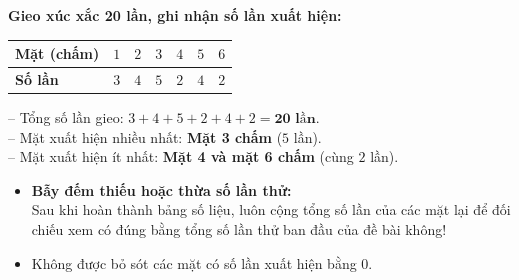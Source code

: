 \documentclass[11pt,a4paper]{article}
\begin{document}
\vspace{-2.5mm}
\noindent
\begin{minipage}[t]{0.49\textwidth}\vspace{0pt}
\begin{tcolorbox}[
  enhanced,
  colback=green!4!white,
  colframe=green!60!black,
  arc=2mm, boxrule=0.8pt,
  left=2mm, right=2mm, top=1.8mm, bottom=1.8mm,
  title={\footnotesize\bfseries\color{white}\faCheckCircle\ Ví dụ thực hành chuẩn mực}
]
{\footnotesize
\textbf{Gieo xúc xắc 20 lần, ghi nhận số lần xuất hiện:}\\
\begin{center}
\renewcommand{\arraystretch}{1.1}
\begin{tabular}{|l|c|c|c|c|c|c|}
  \hline
  \textbf{Mặt (chấm)} & $1$ & $2$ & $3$ & $4$ & $5$ & $6$ \\
  \hline
  \textbf{Số lần} & $3$ & $4$ & $5$ & $2$ & $4$ & $2$ \\
  \hline
\end{tabular}
\end{center}
-- Tổng số lần gieo: $3 + 4 + 5 + 2 + 4 + 2 = \mathbf{20\text{ lần}}$.\\
-- Mặt xuất hiện nhiều nhất: \textbf{Mặt 3 chấm} ($5$ lần).\\
-- Mặt xuất hiện ít nhất: \textbf{Mặt 4 và mặt 6 chấm} (cùng $2$ lần).
}
\end{tcolorbox}
\end{minipage}
\hfill
\begin{minipage}[t]{0.49\textwidth}\vspace{0pt}
\begin{tcolorbox}[
  enhanced,
  colback=red!4!white,
  colframe=red!70!black,
  arc=2mm, boxrule=0.8pt,
  left=2mm, right=2mm, top=1.8mm, bottom=1.8mm,
  title={\footnotesize\bfseries\color{white}\faExclamationTriangle\ Mẹo tránh bẫy trắc nghiệm}
]
{\footnotesize
\begin{itemize}\setlength{\itemsep}{1.5pt}\setlength{\leftskip}{-2.5mm}
  \item \textbf{Bẫy đếm thiếu hoặc thừa số lần thử:}\\
  Sau khi hoàn thành bảng số liệu, luôn cộng tổng số lần của các mặt lại để đối chiếu xem có đúng bằng tổng số lần thử ban đầu của đề bài không!
  \item Không được bỏ sót các mặt có số lần xuất hiện bằng $0$.
\end{itemize}
}
\end{tcolorbox}
\end{minipage}
\end{document}

